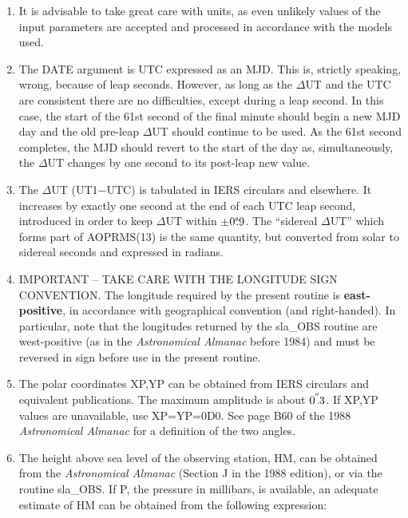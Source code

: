 \documentclass[11pt,twoside]{article}
\newcommand{\arcsec}[2] {\arcseci{#1}$\hspace{-0.4em}.#2$}
\newcommand{\arcsec}[2] {
      {$#1\hspace{-0.05em}^{'\hspace{-0.1em}'}\hspace{-0.4em}.#2$}
   }
\newcommand{\arcseci}[1] {$#1\hspace{-0.05em}$\raisebox{-0.5ex}
                         {$^{'\hspace{-0.1em}'}$}}
\renewcommand{\arcseci}[1] {$#1\hspace{-0.05em}^{'\hspace{-0.1em}'}$}
\newcommand{\tseci}[1]   {$#1$\mbox{$^{\rm s}$}}
\newcommand{\tsec}[2]    {\tseci{#1}$\hspace{-0.3em}.#2$}
\renewcommand{\tsec}[2] {$#1^{\rm s}\hspace{-0.3em}.#2$}
\begin{document}
{
 \begin{enumerate}
  \item It is advisable to take great care with units, as even
        unlikely values of the input parameters are accepted and
        processed in accordance with the models used.
  \item The DATE argument is UTC expressed as an MJD.  This is,
        strictly speaking, wrong, because of leap seconds.  However,
        as long as the $\Delta$UT and the UTC are consistent there
        are no difficulties, except during a leap second.  In this
        case, the start of the 61st second of the final minute should
        begin a new MJD day and the old pre-leap $\Delta$UT should
        continue to be used.  As the 61st second completes, the MJD
        should revert to the start of the day as, simultaneously,
        the $\Delta$UT changes by one second to its post-leap new value.
  \item The $\Delta$UT (UT1$-$UTC) is tabulated in IERS circulars and
        elsewhere.  It increases by exactly one second at the end of
        each UTC leap second, introduced in order to keep $\Delta$UT
        within $\pm$\tsec{0}{9}.  The ``sidereal $\Delta$UT'' which forms
        part of AOPRMS(13) is the same quantity, but converted from solar
        to sidereal seconds and expressed in radians.
  \item IMPORTANT -- TAKE CARE WITH THE LONGITUDE SIGN CONVENTION.  The
        longitude required by the present routine is {\bf east-positive},
        in accordance with geographical convention (and right-handed).
        In particular, note that the longitudes returned by the
        sla\_OBS routine are west-positive (as in the {\it Astronomical
        Almanac}\/ before 1984) and must be reversed in sign before use in
        the present routine.
  \item The polar coordinates XP,YP can be obtained from IERS
        circulars and equivalent publications.  The
        maximum amplitude is about \arcsec{0}{3}.  If XP,YP values
        are unavailable, use XP=YP=0D0.  See page B60 of the 1988
        {\it Astronomical Almanac}\/ for a definition of the two angles.
  \item The height above sea level of the observing station, HM,
        can be obtained from the {\it Astronomical Almanac}\/ (Section J
        in the 1988 edition), or via the routine sla\_OBS.  If P,
        the pressure in millibars, is available, an adequate
        estimate of HM can be obtained from the following expression:

\end{enumerate}}
\end{document}
